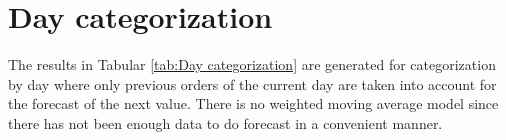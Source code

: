 \section{Day categorization}\label{section:Day categorization}
The results in Tabular \ref{tab:Day categorization} are generated for categorization by day where only previous orders of the current day are taken into account for the forecast of the next value. There is no weighted moving average model since there has not been enough data to do forecast in a convenient manner.
\begin{table}[h]
\centering
\caption{Day categorization without slot}
\label{tab:Day categorization}
\end{table}
